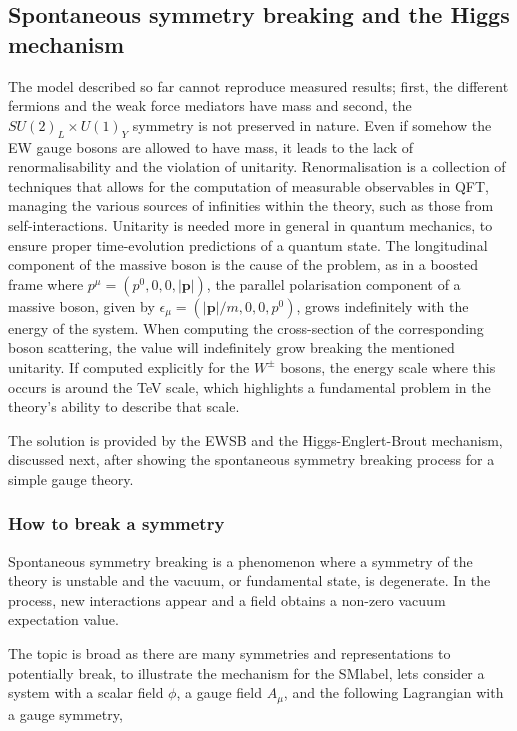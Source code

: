 \subsection{Spontaneous symmetry breaking and the Higgs mechanism}
\label{subsec:SSB}
The model described so far cannot reproduce measured results; first, the different fermions and the weak force mediators have mass and second, the $SU(2)_L\times U(1)_Y$ symmetry is not preserved in nature.
Even if somehow the \acrshort{EW} gauge bosons are allowed to have mass, it leads to the lack of renormalisability and the violation of unitarity.
Renormalisation is a collection of techniques that allows for the computation of measurable observables in \acrshort{QFT}, managing the various sources of infinities within the theory, such as those from self-interactions.
Unitarity is needed more in general in quantum mechanics, to ensure proper time-evolution predictions of a quantum state. The longitudinal component of the massive boson is the cause of the problem,
as in a boosted frame where $p^\mu=(p^0,0,0,|\textbf{p}|)$, the parallel polarisation component of a massive boson, given by $\epsilon_\mu=(|\textbf{p}|/m,0,0,p^0)$, grows indefinitely with the energy of the system.
When computing the cross-section of the corresponding boson scattering, the value will indefinitely grow breaking the mentioned unitarity.
If computed explicitly for the $W^\pm$ bosons, the energy scale where this occurs is around the TeV scale, which highlights a fundamental problem in the theory's ability to describe that scale.

The solution is provided by the \acrshort{EWSB} and the Higgs-Englert-Brout mechanism, discussed next, after showing the spontaneous
symmetry breaking process for a simple gauge theory.

\subsubsection{How to break a symmetry}

Spontaneous symmetry breaking is a phenomenon where a symmetry of the theory is unstable and the vacuum, or fundamental state, is degenerate.
In the process, new interactions appear and a field obtains a non-zero vacuum expectation value.

The topic is broad as there are many symmetries and representations to potentially break, to illustrate the mechanism for the \acrshort{SMlabel},
lets consider a system with a scalar field $\phi$, a gauge field $A_\mu$, and the following Lagrangian with a gauge symmetry,

